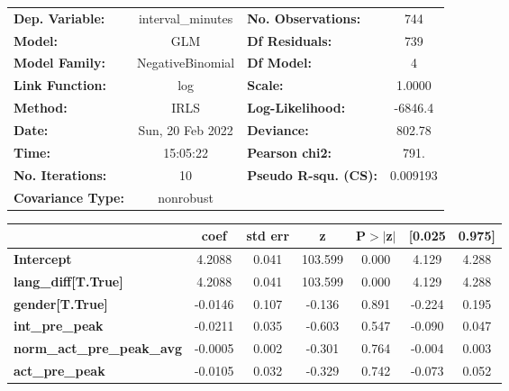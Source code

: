 \begin{center}
\begin{tabular}{lclc}
\toprule
\textbf{Dep. Variable:}            & interval\_minutes & \textbf{  No. Observations:  } &      744    \\
\textbf{Model:}                    &        GLM        & \textbf{  Df Residuals:      } &      739    \\
\textbf{Model Family:}             &  NegativeBinomial & \textbf{  Df Model:          } &        4    \\
\textbf{Link Function:}            &        log        & \textbf{  Scale:             } &    1.0000   \\
\textbf{Method:}                   &        IRLS       & \textbf{  Log-Likelihood:    } &   -6846.4   \\
\textbf{Date:}                     &  Sun, 20 Feb 2022 & \textbf{  Deviance:          } &    802.78   \\
\textbf{Time:}                     &      15:05:22     & \textbf{  Pearson chi2:      } &     791.    \\
\textbf{No. Iterations:}           &         10        & \textbf{  Pseudo R-squ. (CS):} &  0.009193   \\
\textbf{Covariance Type:}          &     nonrobust     & \textbf{                     } &             \\
\bottomrule
\end{tabular}
\begin{tabular}{lcccccc}
                                   & \textbf{coef} & \textbf{std err} & \textbf{z} & \textbf{P$> |$z$|$} & \textbf{[0.025} & \textbf{0.975]}  \\
\midrule
\textbf{Intercept}                 &       4.2088  &        0.041     &   103.599  &         0.000        &        4.129    &        4.288     \\
\textbf{lang\_diff[T.True]}        &       4.2088  &        0.041     &   103.599  &         0.000        &        4.129    &        4.288     \\
\textbf{gender[T.True]}            &      -0.0146  &        0.107     &    -0.136  &         0.891        &       -0.224    &        0.195     \\
\textbf{int\_pre\_peak}            &      -0.0211  &        0.035     &    -0.603  &         0.547        &       -0.090    &        0.047     \\
\textbf{norm\_act\_pre\_peak\_avg} &      -0.0005  &        0.002     &    -0.301  &         0.764        &       -0.004    &        0.003     \\
\textbf{act\_pre\_peak}            &      -0.0105  &        0.032     &    -0.329  &         0.742        &       -0.073    &        0.052     \\
\bottomrule
\end{tabular}
\end{center}